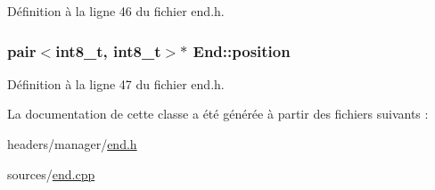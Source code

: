 Définition à la ligne 46 du fichier end.\-h.

\hypertarget{class_end_a842874e9ed3602783ab323850621c060}{
\subsubsection[{position}]{\setlength{\rightskip}{0pt plus 5cm}pair$<$int8\-\_\-t, int8\-\_\-t$>$$\ast$ End\-::position\hspace{0.3cm}{\ttfamily [private]}}}\label{class_end_a842874e9ed3602783ab323850621c060}


Définition à la ligne 47 du fichier end.\-h.



La documentation de cette classe a été générée à partir des fichiers suivants \-:\begin{DoxyCompactItemize}
\item 
headers/manager/\hyperlink{end_8h}{end.\-h}\item 
sources/\hyperlink{end_8cpp}{end.\-cpp}\end{DoxyCompactItemize}
